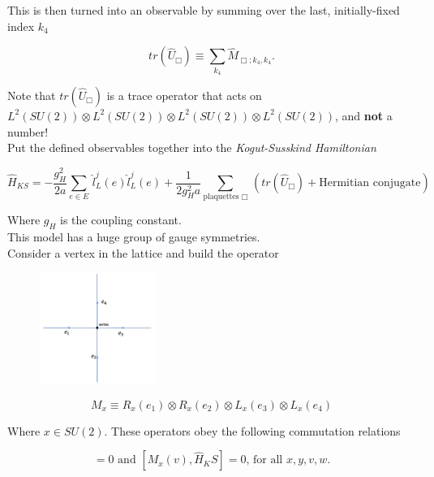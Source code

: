 \noindent This is then turned into an observable by summing over the last, initially-fixed index $k_4$

\begin{equation}
tr(\hat{U}_\Box) \equiv \sum_{k_4} \hat{M}_{\Box; k_4, k_4}.
\end{equation}

\noindent Note that $tr(\hat{U}_\Box)$ is a trace operator that acts on $L^2 (SU(2)) \otimes L^2 (SU(2)) \otimes L^2 (SU(2)) \otimes L^2 (SU(2))$, and \textbf{not} a number! \\

\noindent Put the defined observables together into the \textit{Kogut-Susskind Hamiltonian}

\begin{equation}
\hat{H}_{KS} = -\frac{g_H^2}{2a} \sum_{e \in E} \, \hat{l}_L^j (e) \hat{l}_L^j (e) + \frac{1}{2 g_H^2 a} \sum_{\text{plaquettes } \Box} \, \left(tr(\hat{U}_\Box) + \text{Hermitian conjugate} \right)
\end{equation}

\noindent Where $g_H$ is the coupling constant. \\

\noindent This model has a huge group of gauge symmetries. \\

\noindent Consider a vertex in the lattice and build the operator

\begin{figure}[H]
	\centering
	\includegraphics[width=1.5in]{images/ks_vertex.png}
	\caption*{}
\end{figure}

\begin{equation}
M_x \equiv R_x (e_1) \otimes R_x (e_2) \otimes L_x (e_3) \otimes L_x (e_4)
\end{equation}

\noindent Where $x \in SU(2)$. These operators obey the following commutation relations 

\begin{equation}
[M_x (v), M_y (w)] = 0 \text{ and } [M_x (v), \hat{H}_KS] = 0 \text{, for all } x, y, v, w.
\end{equation}

